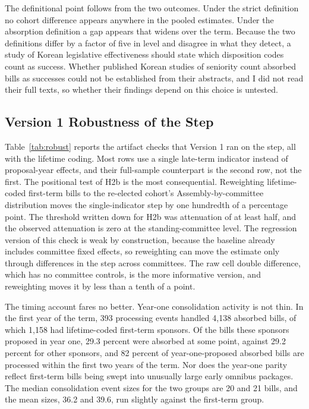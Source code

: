 \documentclass[11pt]{article}
\begin{document}
The definitional point follows from the two outcomes. Under the strict definition no cohort difference appears anywhere in the pooled estimates. Under the absorption definition a gap appears that widens over the term. Because the two definitions differ by a factor of five in level and disagree in what they detect, a study of Korean legislative effectiveness should state which disposition codes count as success. Whether published Korean studies of seniority \citep{an2025, jeong2016, ka2025a} count absorbed bills as successes could not be established from their abstracts, and I did not read their full texts, so whether their findings depend on this choice is untested.

\subsection{Version 1 Robustness of the Step}

Table~\ref{tab:robust} reports the artifact checks that Version 1 ran on the step, all with the lifetime coding. Most rows use a single late-term indicator instead of proposal-year effects, and their full-sample counterpart is the second row, not the first. The positional test of H2b is the most consequential. Reweighting lifetime-coded first-term bills to the re-elected cohort's Assembly-by-committee distribution moves the single-indicator step by one hundredth of a percentage point. The threshold written down for H2b was attenuation of at least half, and the observed attenuation is zero at the standing-committee level. The regression version of this check is weak by construction, because the baseline already includes committee fixed effects, so reweighting can move the estimate only through differences in the step across committees. The raw cell double difference, which has no committee controls, is the more informative version, and reweighting moves it by less than a tenth of a point.

The timing account fares no better. Year-one consolidation activity is not thin. In the first year of the term, 393 processing events handled 4,138 absorbed bills, of which 1,158 had lifetime-coded first-term sponsors. Of the bills these sponsors proposed in year one, 29.3 percent were absorbed at some point, against 29.2 percent for other sponsors, and 82 percent of year-one-proposed absorbed bills are processed within the first two years of the term. Nor does the year-one parity reflect first-term bills being swept into unusually large early omnibus packages. The median consolidation event sizes for the two groups are 20 and 21 bills, and the mean sizes, 36.2 and 39.6, run slightly against the first-term group.
\end{document}
